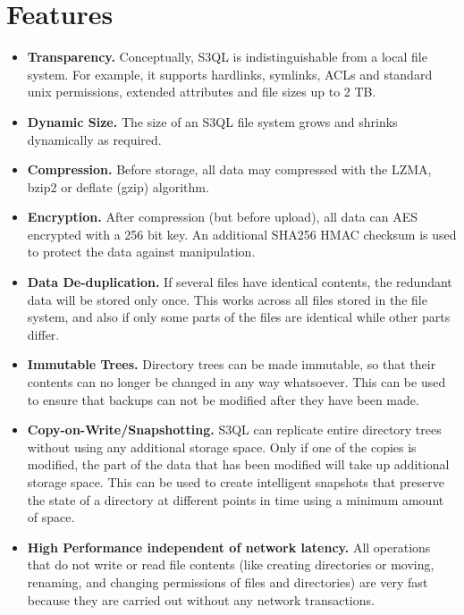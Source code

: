 \documentclass[letterpaper,10pt,english]{sphinxmanual}
\begin{document}
\section{Features}
\label{about:features}\begin{itemize}
\item {} 
\textbf{Transparency.} Conceptually, S3QL is indistinguishable from a
local file system. For example, it supports hardlinks, symlinks,
ACLs and standard unix permissions, extended attributes and file
sizes up to 2 TB.

\item {} 
\textbf{Dynamic Size.} The size of an S3QL file system grows and shrinks
dynamically as required.

\item {} 
\textbf{Compression.} Before storage, all data may compressed with the
LZMA, bzip2 or deflate (gzip) algorithm.

\item {} 
\textbf{Encryption.} After compression (but before upload), all data can
AES encrypted with a 256 bit key. An additional SHA256 HMAC checksum
is used to protect the data against manipulation.

\item {} 
\textbf{Data De-duplication.} If several files have identical contents,
the redundant data will be stored only once. This works across all
files stored in the file system, and also if only some parts of the
files are identical while other parts differ.

\item {} 
\textbf{Immutable Trees.} Directory trees can be made immutable, so that
their contents can no longer be changed in any way whatsoever. This
can be used to ensure that backups can not be modified after they
have been made.

\item {} 
\textbf{Copy-on-Write/Snapshotting.} S3QL can replicate entire directory
trees without using any additional storage space. Only if one of the
copies is modified, the part of the data that has been modified will
take up additional storage space. This can be used to create
intelligent snapshots that preserve the state of a directory at
different points in time using a minimum amount of space.

\item {} 
\textbf{High Performance independent of network latency.} All operations
that do not write or read file contents (like creating directories
or moving, renaming, and changing permissions of files and
directories) are very fast because they are carried out without any
network transactions.


\end{itemize}
\end{document}

